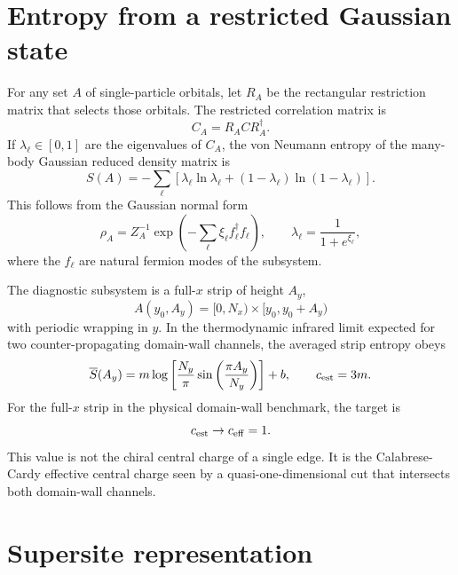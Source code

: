 \documentclass[aps,prb,twocolumn,floatfix]{revtex4-2}
\begin{document}
\section{Entropy from a restricted Gaussian state}

For any set \(A\) of single-particle orbitals, let \(R_A\) be the rectangular
restriction matrix that selects those orbitals.  The restricted correlation
matrix is
\begin{equation}
  C_A = R_A C R_A^\dagger.
  \label{eq:restricted-c}
\end{equation}
If \(\lambda_\ell\in[0,1]\) are the eigenvalues of \(C_A\), the von Neumann
entropy of the many-body Gaussian reduced density matrix is
\begin{equation}
  S(A)= -\sum_{\ell}
  \left[
    \lambda_\ell\ln\lambda_\ell
    +(1-\lambda_\ell)\ln(1-\lambda_\ell)
  \right].
  \label{eq:entropy}
\end{equation}
This follows from the Gaussian normal form
\begin{equation}
  \rho_A = Z_A^{-1}\exp\left(-\sum_\ell \xi_\ell f_\ell^\dagger f_\ell\right),
  \qquad
  \lambda_\ell = \frac{1}{1+e^{\xi_\ell}},
  \label{eq:rho-gaussian}
\end{equation}
where the \(f_\ell\) are natural fermion modes of the subsystem.

The diagnostic subsystem is a full-\(x\) strip of height \(A_y\),
\begin{equation}
  A(y_0,A_y)=
  [0,N_x)\times[y_0,y_0+A_y)
\end{equation}
with periodic wrapping in \(y\).  In the thermodynamic infrared limit expected
for two counter-propagating domain-wall channels, the averaged strip entropy
obeys
\begin{equation}
  \overline{S}(A_y)
  = m \log\left[
      \frac{N_y}{\pi}\sin\left(\frac{\pi A_y}{N_y}\right)
    \right]+b,
  \qquad
  c_{\rm est}=3m.
  \label{eq:logchord}
\end{equation}
For the full-\(x\) strip in the physical domain-wall benchmark, the target is
\begin{equation}
  c_{\rm est}\to c_{\rm eff}=1.
  \label{eq:target-c}
\end{equation}
This value is not the chiral central charge of a single edge.  It is the
Calabrese-Cardy effective central charge seen by a quasi-one-dimensional cut
that intersects both domain-wall channels.

\section{Supersite representation}
\end{document}
